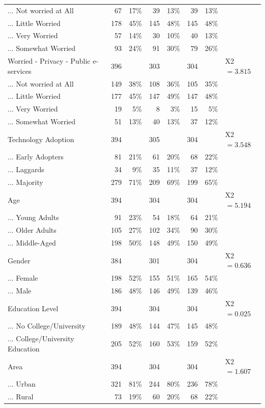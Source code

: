 \begin{table}[!htbp]
{\begin{tabular}{lrrrrrrl}
... Not worried at All & 67 & 17\% & 39 & 13\% & 39 & 13\% &  \\ 
... Little Worried & 178 & 45\% & 145 & 48\% & 145 & 48\% &  \\ 
... Very Worried & 57 & 14\% & 30 & 10\% & 40 & 13\% &  \\ 
... Somewhat Worried & 93 & 24\% & 91 & 30\% & 79 & 26\% &  \\ 
Worried - Privacy - Public e-services & 396 &  & 303 &  & 304 &  & X2$=3.815^{}$ \\ 
... Not worried at All & 149 & 38\% & 108 & 36\% & 105 & 35\% &  \\ 
... Little Worried & 177 & 45\% & 147 & 49\% & 147 & 48\% &  \\ 
... Very Worried & 19 & 5\% & 8 & 3\% & 15 & 5\% &  \\ 
... Somewhat Worried & 51 & 13\% & 40 & 13\% & 37 & 12\% &  \\ 
Technology Adoption & 394 &  & 305 &  & 304 &  & X2$=3.548^{}$ \\ 
... Early Adopters & 81 & 21\% & 61 & 20\% & 68 & 22\% &  \\ 
... Laggards & 34 & 9\% & 35 & 11\% & 37 & 12\% &  \\ 
... Majority & 279 & 71\% & 209 & 69\% & 199 & 65\% &  \\ 
Age & 394 &  & 304 &  & 304 &  & X2$=5.194^{}$ \\ 
... Young Adults & 91 & 23\% & 54 & 18\% & 64 & 21\% &  \\ 
... Older Adults & 105 & 27\% & 102 & 34\% & 90 & 30\% &  \\ 
... Middle-Aged & 198 & 50\% & 148 & 49\% & 150 & 49\% &  \\ 
Gender & 384 &  & 301 &  & 304 &  & X2$=0.636^{}$ \\ 
... Female & 198 & 52\% & 155 & 51\% & 165 & 54\% &  \\ 
... Male & 186 & 48\% & 146 & 49\% & 139 & 46\% &  \\ 
Education Level & 394 &  & 304 &  & 304 &  & X2$=0.025^{}$ \\ 
... No College/University & 189 & 48\% & 144 & 47\% & 145 & 48\% &  \\ 
... College/University Education & 205 & 52\% & 160 & 53\% & 159 & 52\% &  \\ 
Area & 394 &  & 304 &  & 304 &  & X2$=1.607^{}$ \\ 
... Urban & 321 & 81\% & 244 & 80\% & 236 & 78\% &  \\ 
... Rural & 73 & 19\% & 60 & 20\% & 68 & 22\% &  \\ 

\end{tabular}}
\end{table}
